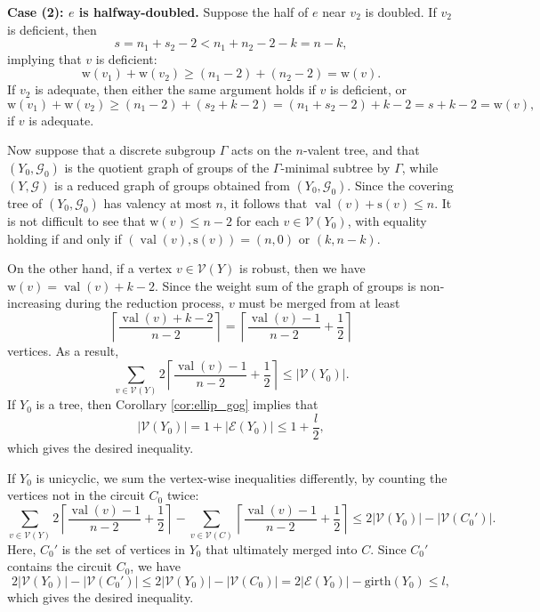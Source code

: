 \documentclass[12pt,leqno]{amsart}
\makeatletter
\renewenvironment{proof}[1][\proofname]{%
	\par
	\pushQED{\qed}%
	\normalfont
	\topsep6\p@\@plus6\p@\relax
	\trivlist
	\item[\hskip\labelsep\itshape #1\@addpunct{.}]%
	\ignorespaces
}{%
	\par\nobreak\vspace{2pt}%
	\popQED%
	\medskip%
	\endtrivlist
	\@endpefalse
}
\newcommand{\2}{L^2_{\rm per}(0, T)}
\newcommand{\val}{{\operatorname{val}}}
\numberwithin{equation}{section}
\numberwithin{figure}{section}
\makeatother
\begin{document}
\begin{proof}
\begin{proof}
        \textbf{Case (2): $e$ is halfway-doubled.} Suppose the half of $e$ near $v_2$ is doubled. If $v_2$ is deficient, then
        \[
        s = n_1 + s_2 - 2< n_1+n_2 - 2 - k = n-k,
        \]
        implying that $v$ is deficient:
        \[
        \mathrm{w}(v_1) + \mathrm{w}(v_2) \geq (n_1-2)+(n_2-2) = \mathrm{w}(v).
        \]
        If $v_2$ is adequate, then either the same argument holds if $v$ is deficient, or
        \[
        \mathrm{w}(v_1) + \mathrm{w}(v_2) \geq (n_1-2) + (s_2 + k-2) = (n_1+s_2 - 2) + k-2 = s + k-2 = \mathrm{w}(v),
        \]
        if $v$ is adequate.
    \end{proof}
    Now suppose that a discrete subgroup $\Gamma$ acts on the $n$-valent tree, and that $(Y_0,\mathcal{G}_0)$ is the quotient graph of groups of the $\Gamma$-minimal subtree by $\Gamma$, while $(Y,\mathcal{G})$ is a reduced graph of groups obtained from $(Y_0,\mathcal{G}_0)$. Since the covering tree of $(Y_0,\mathcal{G}_0)$ has valency at most $n$, it follows that $\val(v)+\mathrm{s}(v)\leq n$. It is not difficult to see that $\mathrm{w}(v)\leq n-2$ for each $v\in \mathcal{V}(Y_0)$, with equality holding if and only if $(\val(v),\mathrm{s}(v)) = (n,0)$ or $(k,n-k)$.

    On the other hand, if a vertex $v\in\mathcal{V}(Y)$ is robust, then we have $\mathrm{w}(v) = \val(v)+k-2$. Since the weight sum of the graph of groups is non-increasing during the reduction process, $v$ must be merged from at least
    \[
    \left\lceil\frac{\val(v)+k-2}{n-2}\right\rceil = \left\lceil\frac{\val(v)-1}{n-2}+\frac{1}{2}\right\rceil
    \]
    vertices. As a result,
    \[
    \sum_{v\in\mathcal{V}(Y)}2\left\lceil\frac{\val(v)-1}{n-2}+\frac{1}{2}\right\rceil\leq \lvert \mathcal{V}(Y_0)\rvert.
    \]
    If $Y_0$ is a tree, then Corollary \ref{cor:ellip_gog} implies that
    \[
    \lvert \mathcal{V}(Y_0)\rvert = 1+\lvert \mathcal{E}(Y_0)\rvert\leq 1+\frac{l}{2},
    \]
    which gives the desired inequality.

    If $Y_0$ is unicyclic, we sum the vertex-wise inequalities differently, by counting the vertices not in the circuit $C_0$ twice:
    \[
    \sum_{v\in\mathcal{V}(Y)}2\left\lceil\frac{\val(v)-1}{n-2}+\frac{1}{2}\right\rceil - \sum_{v\in\mathcal{V}(C)}\left\lceil\frac{\val(v)-1}{n-2}+\frac{1}{2}\right\rceil \leq 2\lvert \mathcal{V}(Y_0)\rvert - \lvert \mathcal{V}(C_0')\rvert.
    \]
    Here, $C_0'$ is the set of vertices in $Y_0$ that ultimately merged into $C$. Since $C_0'$ contains the circuit $C_0$, we have
    \[
    2\lvert \mathcal{V}(Y_0)\rvert - \lvert \mathcal{V}(C_0')\rvert\leq 2\lvert \mathcal{V}(Y_0)\rvert - \lvert \mathcal{V}(C_0)\rvert = 2\lvert \mathcal{E}(Y_0)\rvert -\mathrm{girth}(Y_0)\leq l,
    \]
    which gives the desired inequality.


\end{proof}
\end{document}

